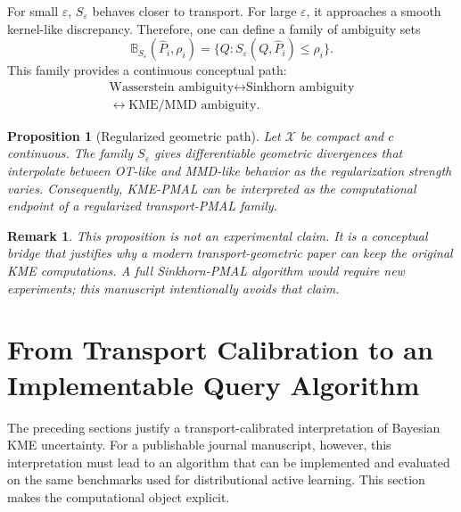 \documentclass[10pt,journal]{IEEEtran}
\newtheorem{proposition}{Proposition}
\newtheorem{remark}{Remark}
\newcommand{\Xcal}{\mathcal{X}}
\newcommand{\eps}{\varepsilon}
\newcommand{\wh}{\widehat}
\newcommand{\ball}{\mathbb{B}}
\begin{document}
For small $\eps$, $S_\eps$ behaves closer to transport. For large $\eps$, it approaches a smooth kernel-like discrepancy. Therefore, one can define a family of ambiguity sets
\begin{equation}
    \ball_{S_\eps}(\wh P_i,\rho_i)=\{Q:S_\eps(Q,\wh P_i)\le \rho_i\}.
\end{equation}
This family provides a continuous conceptual path:
\begin{equation}
\begin{array}{c}
\text{Wasserstein ambiguity}
\longleftrightarrow
\text{Sinkhorn ambiguity}\\[0.15em]
\longleftrightarrow
\text{KME/MMD ambiguity}.
\end{array}
\end{equation}

\begin{proposition}[Regularized geometric path]
\label{prop:path}
Let $\Xcal$ be compact and $c$ continuous. The family $S_\eps$ gives differentiable geometric divergences that interpolate between OT-like and MMD-like behavior as the regularization strength varies. Consequently, KME-PMAL can be interpreted as the computational endpoint of a regularized transport-PMAL family.
\end{proposition}

\begin{remark}
This proposition is not an experimental claim. It is a conceptual bridge that justifies why a modern transport-geometric paper can keep the original KME computations. A full Sinkhorn-PMAL algorithm would require new experiments; this manuscript intentionally avoids that claim.
\end{remark}


\section{From Transport Calibration to an Implementable Query Algorithm}
\label{sec:algorithm}

The preceding sections justify a transport-calibrated interpretation of Bayesian KME uncertainty. For a publishable journal manuscript, however, this interpretation must lead to an algorithm that can be implemented and evaluated on the same benchmarks used for distributional active learning. This section makes the computational object explicit.
\end{document}
